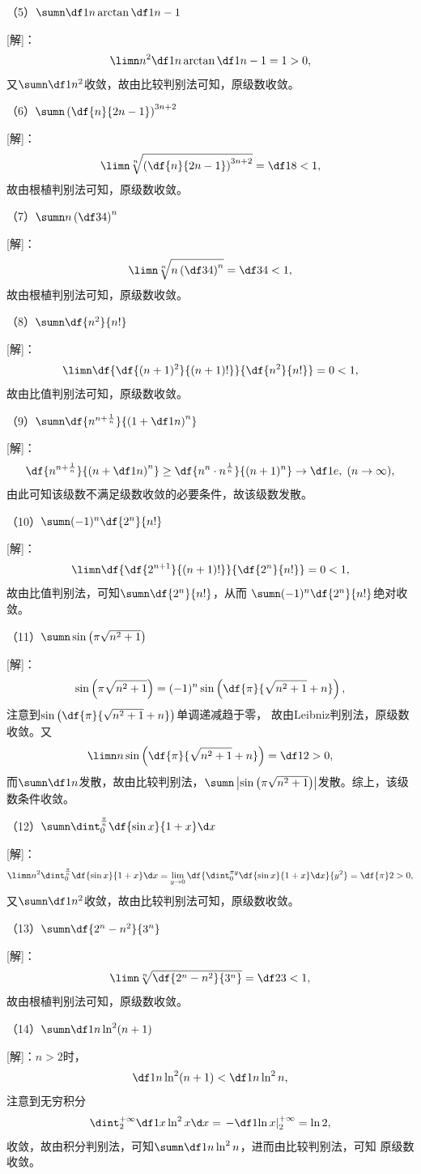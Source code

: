 （5）$\sumn\df1n\arctan\df1{n-1}$

[解]：
$$\limn n^2\df1n\arctan\df1{n-1}=1>0,$$
又$\sumn\df1{n^2}$收敛，故由比较判别法可知，原级数收敛。

（6）$\sumn\left(\df{n}{2n-1}\right)^{3n+2}$

[解]：
$$\limn\sqrt[n]{\left(\df{n}{2n-1}\right)^{3n+2}}=\df18<1,$$
故由根植判别法可知，原级数收敛。

（7）$\sumn n\left(\df34\right)^n$

[解]：
$$\limn \sqrt[n]{n\left(\df34\right)^n}=\df34<1,$$
故由根植判别法可知，原级数收敛。

（8）$\sumn\df{n^2}{n!}$

[解]：
$$\limn\df{\df{(n+1)^2}{(n+1)!}}{\df{n^2}{n!}}=0<1,$$
故由比值判别法可知，原级数收敛。

（9）$\sumn\df{n^{n+\frac1n}}{\left(1+\df1n\right)^n}$

[解]：
$$\df{n^{n+\frac1n}}{\left(n+\df1n\right)^n}\geq\df{n^n\cdot
n^{\frac1n}}{(n+1)^n}\to\df1e,\;(n\to\infty),$$
由此可知该级数不满足级数收敛的必要条件，故该级数发散。

（10）$\sumn(-1)^n\df{2^n}{n!}$

[解]：
$$\limn\df{\df{2^{n+1}}{(n+1)!}}{\df{2^n}{n!}}=0<1,$$
故由比值判别法，可知$\sumn\df{2^n}{n!}$，从而
$\sumn(-1)^n\df{2^n}{n!}$绝对收敛。

（11）$\sumn\sin\left(\pi\sqrt{n^2+1}\right)$

[解]：
$$\sin\left(\pi\sqrt{n^2+1}\right)=(-1)^n
\sin\left(\df{\pi}{\sqrt{n^2+1}+n}\right),$$
注意到$\sin\left(\df{\pi}{\sqrt{n^2+1}+n}\right)$单调递减趋于零，
故由Leibniz判别法，原级数收敛。又
$$\limn n\sin\left(\df{\pi}{\sqrt{n^2+1}+n}\right)=\df12>0,$$
而$\sumn\df1n$发散，故由比较判别法，$\sumn\left|\sin
\left(\pi\sqrt{n^2+1}\right)\right|$发散。综上，该级数条件收敛。

（12）$\sumn\dint_0^{\frac{\pi}n}\df{\sin x}{1+x}\d x$

[解]：
$$\limn n^2\dint_0^{\frac{\pi}n}\df{\sin x}{1+x}\d x
=\lim\limits_{y\to0}\df{\dint_0^{{\pi}y}\df{\sin x}{1+x}\d x}{y^2}
=\df{\pi}2>0,$$
又$\sumn\df1{n^2}$收敛，故由比较判别法可知，原级数收敛。

（13）$\sumn\df{2^n-n^2}{3^n}$

[解]：
$$\limn\sqrt[n]{\df{2^n-n^2}{3^n}}=\df23<1,$$
故由根植判别法可知，原级数收敛。

（14）$\sumn\df1{n\ln^2(n+1)}$

[解]：$n>2$时，
$$\df1{n\ln^2(n+1)}<\df1{n\ln^2n},$$
注意到无穷积分
$$\dint_2^{+\infty}\df1{x\ln^2x}\d x
=\left.-\df1{\ln x}\right|_2^{+\infty}=\ln2,$$
收敛，故由积分判别法，可知$\sumn\df1{n\ln^2n}$，进而由比较判别法，可知
原级数收敛。\fin

